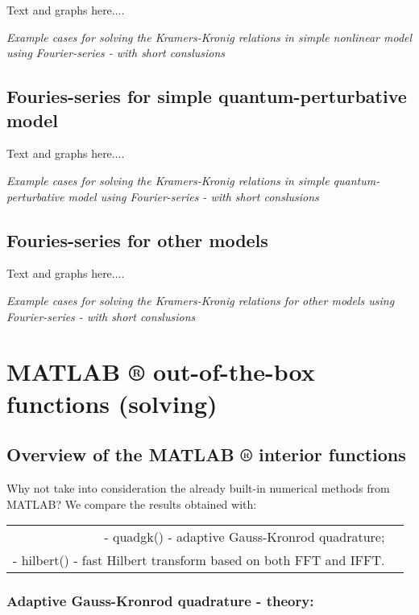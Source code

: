 \documentclass[12pt,twoside,a4paper]{article}
\numberwithin{equation}{subsection}
\numberwithin{figure}{subsection}
\begin{document}
Text and graphs here.... 

\textit{Example cases for solving the Kramers-Kronig relations in simple nonlinear model using Fourier-series - with short
conslusions}

\subsection{Fouries-series for simple quantum-perturbative model} \label{chap:fourier_quantum}

Text and graphs here.... 

\textit{Example cases for solving the Kramers-Kronig relations in simple quantum-perturbative model using Fourier-series - with
short conslusions}

\subsection{Fouries-series for other models} \label{chap:fourier_other}

Text and graphs here.... 

\textit{Example cases for solving the Kramers-Kronig relations for other models using Fourier-series - with short conslusions}

\section{MATLAB ® out-of-the-box functions (solving)} \label{chap:matlab}

\subsection{Overview of the MATLAB ® interior functions} \label{chap:matlab_overview}

Why not take into consideration the already built-in numerical methods from MATLAB? We compare the results obtained with: 
\begin{tabular}{r l}
  - quadgk() - adaptive Gauss-Kronrod quadrature; \\
  - hilbert() - fast Hilbert transform based on both FFT and IFFT. \\
\end{tabular}

\subsubsection*{Adaptive Gauss-Kronrod quadrature - theory:}
\end{document}
